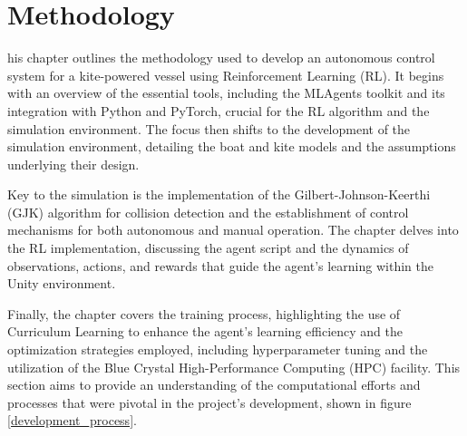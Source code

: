 
%
\let\textcircled=\pgftextcircled\chapter{Methodology}


his chapter outlines the methodology used to develop an autonomous control system for a kite-powered vessel using Reinforcement Learning (RL). It begins with an overview of the essential tools, including the MLAgents toolkit and its integration with Python and PyTorch, crucial for the RL algorithm and the simulation environment. The focus then shifts to the development of the simulation environment, detailing the boat and kite models and the assumptions underlying their design.

Key to the simulation is the implementation of the Gilbert-Johnson-Keerthi (GJK) algorithm for collision detection and the establishment of control mechanisms for both autonomous and manual operation. The chapter delves into the RL implementation, discussing the agent script and the dynamics of observations, actions, and rewards that guide the agent's learning within the Unity environment.

Finally, the chapter covers the training process, highlighting the use of Curriculum Learning to enhance the agent's learning efficiency and the optimization strategies employed, including hyperparameter tuning and the utilization of the Blue Crystal High-Performance Computing (HPC) facility. This section aims to provide an understanding of the computational efforts and processes that were pivotal in the project’s development, shown in figure$~$\ref{development_process}. 

